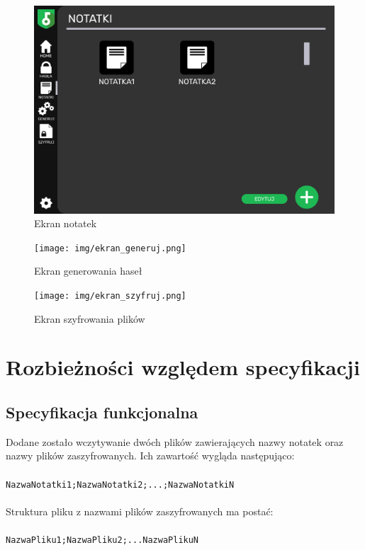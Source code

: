 \documentclass[a4paper]{article}
\newcommand{\prog}{\texttt}
\begin{document}
\begin{figure}[H]
    \centering
    \includegraphics[width=1\textwidth]{img/ekran_notatek.png}
    \caption{Ekran notatek}
\end{figure}

\begin{figure}[H]
    \centering
    \texttt{[image: img/ekran\_generuj.png]}
    \caption{Ekran generowania haseł}
\end{figure}

\begin{figure}[H]
    \centering
    \texttt{[image: img/ekran\_szyfruj.png]}
    \caption{Ekran szyfrowania plików}
\end{figure}

\section{Rozbieżności względem specyfikacji}
\subsection{Specyfikacja funkcjonalna}
Dodane zostało wczytywanie dwóch plików zawierających nazwy notatek oraz nazwy plików zaszyfrowanych. Ich zawartość wygląda następująco:\\ \\
\prog{NazwaNotatki1;NazwaNotatki2;...;NazwaNotatkiN}\\ \\
Struktura pliku z nazwami plików zaszyfrowanych ma postać:\\ \\
\prog{NazwaPliku1;NazwaPliku2;...NazwaPlikuN}
\end{document}
